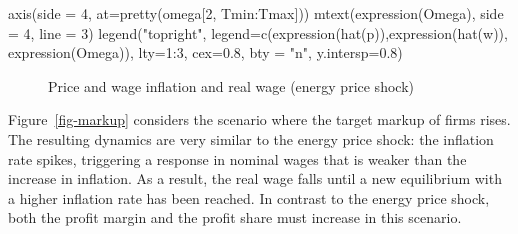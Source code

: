 \documentclass[
  letterpaper,
  DIV=11,
  numbers=noendperiod]{scrreprt}
\newenvironment{Shaded}{\begin{snugshade}}{\end{snugshade}}
\newcommand{\AttributeTok}[1]{\textcolor[rgb]{0.40,0.45,0.13}{#1}}
\newcommand{\DecValTok}[1]{\textcolor[rgb]{0.68,0.00,0.00}{#1}}
\newcommand{\FloatTok}[1]{\textcolor[rgb]{0.68,0.00,0.00}{#1}}
\newcommand{\FunctionTok}[1]{\textcolor[rgb]{0.28,0.35,0.67}{#1}}
\newcommand{\NormalTok}[1]{\textcolor[rgb]{0.00,0.23,0.31}{#1}}
\newcommand{\SpecialCharTok}[1]{\textcolor[rgb]{0.37,0.37,0.37}{#1}}
\newcommand{\StringTok}[1]{\textcolor[rgb]{0.13,0.47,0.30}{#1}}
\begin{document}
\begin{Shaded}
\begin{Highlighting}[]
\FunctionTok{axis}\NormalTok{(}\AttributeTok{side =} \DecValTok{4}\NormalTok{, }\AttributeTok{at=}\FunctionTok{pretty}\NormalTok{(omega[}\DecValTok{2}\NormalTok{, Tmin}\SpecialCharTok{:}\NormalTok{Tmax]))  }
\FunctionTok{mtext}\NormalTok{(}\FunctionTok{expression}\NormalTok{(Omega), }\AttributeTok{side =} \DecValTok{4}\NormalTok{, }\AttributeTok{line =} \DecValTok{3}\NormalTok{)}
\FunctionTok{legend}\NormalTok{(}\StringTok{"topright"}\NormalTok{, }\AttributeTok{legend=}\FunctionTok{c}\NormalTok{(}\FunctionTok{expression}\NormalTok{(}\FunctionTok{hat}\NormalTok{(p)),}\FunctionTok{expression}\NormalTok{(}\FunctionTok{hat}\NormalTok{(w)), }\FunctionTok{expression}\NormalTok{(Omega)),}
       \AttributeTok{lty=}\DecValTok{1}\SpecialCharTok{:}\DecValTok{3}\NormalTok{, }\AttributeTok{cex=}\FloatTok{0.8}\NormalTok{, }\AttributeTok{bty =} \StringTok{"n"}\NormalTok{, }\AttributeTok{y.intersp=}\FloatTok{0.8}\NormalTok{)}
\end{Highlighting}
\end{Shaded}

\begin{figure}[H]


\caption{\label{fig-energy}Price and wage inflation and real wage
(energy price shock)}

\end{figure}%

Figure~\ref{fig-markup} considers the scenario where the target markup
of firms rises. The resulting dynamics are very similar to the energy
price shock: the inflation rate spikes, triggering a response in nominal
wages that is weaker than the increase in inflation. As a result, the
real wage falls until a new equilibrium with a higher inflation rate has
been reached. In contrast to the energy price shock, both the profit
margin and the profit share must increase in this scenario.
\end{document}

